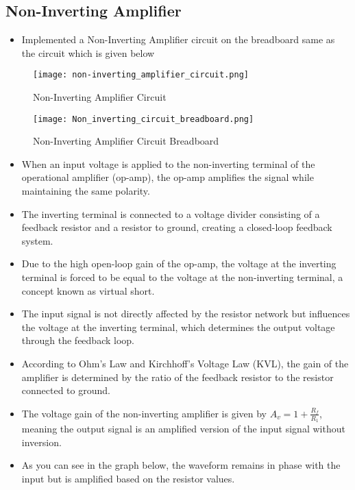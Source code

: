 \documentclass[9pt,conference]{IEEEtran}
\begin{document}
\subsection{Non-Inverting Amplifier}
\begin{itemize}
    \item Implemented a Non-Inverting Amplifier circuit on the breadboard same as the circuit which is given below
\end{itemize}
\begin{figure}[H]
    \centering
    \texttt{[image: non-inverting\_amplifier\_circuit.png]}
    \caption{Non-Inverting Amplifier Circuit}
    \label{fig:clamper_circuit}
\end{figure}

\begin{figure}[H]
    \centering
    \texttt{[image: Non\_inverting\_circuit\_breadboard.png]}
    \caption{Non-Inverting Amplifier Circuit Breadboard}
    \label{fig:positive_clamper}
\end{figure}

\begin{itemize}
    \item When an input voltage is applied to the non-inverting terminal of the operational amplifier (op-amp), the op-amp amplifies the signal while maintaining the same polarity.
    \item The inverting terminal is connected to a voltage divider consisting of a feedback resistor and a resistor to ground, creating a closed-loop feedback system.
    \item Due to the high open-loop gain of the op-amp, the voltage at the inverting terminal is forced to be equal to the voltage at the non-inverting terminal, a concept known as virtual short.
    \item The input signal is not directly affected by the resistor network but influences the voltage at the inverting terminal, which determines the output voltage through the feedback loop.
    \item According to Ohm's Law and Kirchhoff's Voltage Law (KVL), the gain of the amplifier is determined by the ratio of the feedback resistor to the resistor connected to ground.
    \item The voltage gain of the non-inverting amplifier is given by \( A_v = 1 + \frac{R_f}{R_1} \), meaning the output signal is an amplified version of the input signal without inversion.
    \item As you can see in the graph below, the waveform remains in phase with the input but is amplified based on the resistor values.
\end{itemize}
\end{document}
